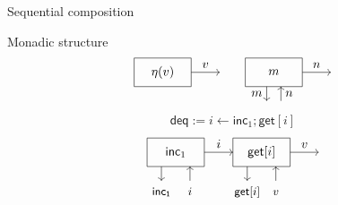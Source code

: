 \documentclass[aspectratio=141]{beamer}
\newcommand{\kw}[1]{\ensuremath{ \mathsf{#1} }}
\begin{document}
\begin{frame}[fragile]{Sequential composition}
\begin{block}{Monadic structure}
\[    %
    \begin{tikzpicture}[scale=0.4,baseline=0]
      \draw (-2,-1) rectangle (2,1);
      \draw[->] (2,0) -- node[above] {$v$} (4,0);
      \node (L) at (0,0) {$\eta(v)$};
    \end{tikzpicture}
    \qquad
    \begin{tikzpicture}[scale=0.4,baseline=0]
      \draw (-2,-1) rectangle (2,1);
      \draw[->] (2,0) -- node[above] {$n$} (4,0);
      \node (L) at (0,0) {$m$};
      \draw[->] (-0.5, -1) -- node[left]  {$m$} (-0.5, -2);
      \draw[->] ( 0.5, -2) -- node[right] {$n$} ( 0.5, -1);
    \end{tikzpicture}
  \]
\end{block}

\begin{example}
  \[
    \kw{deq} :=
      i \leftarrow \kw{inc}_1 \mathrel{;} \kw{get}[i]
  \]
  \[
    \begin{tikzpicture}[scale=0.4]
      \begin{scope}[xshift=-6cm]
        \draw (-2,-1) rectangle (2,1);
        \node (L) at (0,0) {$\kw{inc}_1$};
        \draw[->] (-1, -1) -- (-1, -2);
        \node[anchor=base] at (-1,-3) {\small $\kw{inc_1}$};
        \draw[->] (1, -2) -- (1, -1);
        \node[anchor=base] at (1,-3) {\small $i$};
        \draw[->] (2,0) -- node[above] {$i$} (4,0);
      \end{scope}
      \begin{scope}
        \draw (-2,-1) rectangle (2,1);
        \node (L) at (0,0) {$\kw{get}[i]$};
        \draw[->] (-1, -1) -- (-1, -2);
        \node[anchor=base] at (-1, -3) {\small $\kw{get}[i]$};
        \draw[->] (1, -2) -- (1, -1);
        \node[anchor=base] at (1, -3) {\small $v$};
        \draw[->] (2,0) -- node[above] {$v$} (4,0);
      \end{scope}
    \end{tikzpicture}%
  \]
\end{example}
\end{frame}
\end{document}

